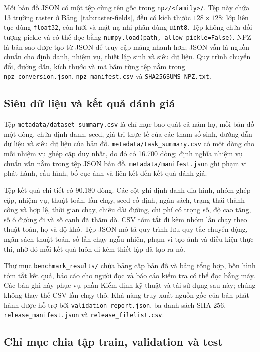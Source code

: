 \documentclass[11pt]{article}
\begin{document}
Mỗi bản đồ JSON có một tệp cùng tên gốc trong \texttt{npz/<family>/}. Tệp này
chứa 13 trường raster ở Bảng~\ref{tab:raster-fields}, đều có kích thước
$128\times128$: lớp liên tục dùng \texttt{float32}, còn lưới và mặt nạ nhị phân
dùng \texttt{uint8}. Tệp không chứa đối tượng pickle và có thể đọc bằng
\texttt{numpy.load(path, allow\_pickle=False)}. NPZ là bản sao được tạo từ JSON
để truy cập mảng nhanh hơn; JSON vẫn là nguồn chuẩn cho định danh, nhiệm vụ,
thiết lập sinh và siêu dữ liệu. Quy trình chuyển đổi, đường dẫn, kích thước và mã băm từng tệp
nằm trong \texttt{npz\_conversion.json}, \texttt{npz\_manifest.csv} và
\texttt{SHA256SUMS\_NPZ.txt}.

\subsection{Siêu dữ liệu và kết quả đánh giá}

Tệp \texttt{metadata/dataset\_summary.csv} là chỉ mục bao quát cả năm họ, mỗi bản đồ
một dòng, chứa định danh, seed, giá trị thực tế của các tham số sinh, đường dẫn dữ liệu
và siêu dữ liệu của bản đồ. \texttt{metadata/task\_summary.csv} có một dòng cho mỗi
nhiệm vụ ghép cặp duy nhất, do đó có 16.700 dòng; định nghĩa nhiệm vụ chuẩn vẫn
nằm trong tệp JSON bản đồ. \texttt{metadata/manifest.json} ghi phạm vi phát hành, cấu
hình, bố cục ảnh và liên kết đến kết quả đánh giá.

Tệp kết quả chi tiết có 90.180 dòng. Các cột ghi định danh địa hình, nhóm ghép cặp,
nhiệm vụ, thuật toán, lần chạy, seed cố định, ngân sách, trạng thái thành công và hợp
lệ, thời gian chạy, chiều dài đường, chi phí có trọng số, độ cao tăng, số ô đường
đi và số cạnh đã thăm dò. CSV tóm tắt đi kèm nhóm lần chạy theo thuật toán, họ
và độ khó. Tệp JSON mô tả quy trình lưu quy tắc chuyển động, ngân sách thuật toán, số lần
chạy ngẫu nhiên,
phạm vi tạo ảnh và điều kiện thực thi, nhờ đó mỗi kết quả luôn đi kèm thiết lập
đã tạo ra nó.

Thư mục \texttt{benchmark\_results/} chứa bảng cấp bản đồ và bảng tổng hợp, bốn
hình tóm tắt kết quả, báo cáo cho người đọc và báo cáo kiểm tra có thể đọc
bằng máy. Các bản ghi
này phục vụ phần Kiểm định kỹ thuật và tái sử dụng sau này; chúng không thay thế
CSV lần chạy thô. Khả năng truy xuất nguồn gốc của bản phát hành được hỗ trợ bởi
\texttt{validation\_report.json}, ba danh sách SHA-256,
\texttt{release\_manifest.json} và \texttt{release\_filelist.csv}.

\subsection{Chỉ mục chia tập train, validation và test}
\end{document}
